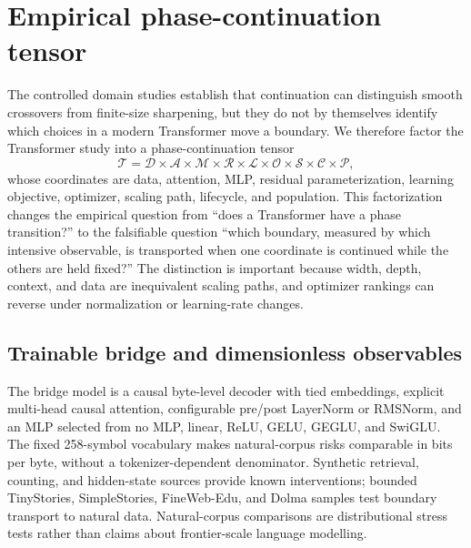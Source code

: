 \section{Empirical phase-continuation tensor}
\label{sec:empirical-tensor}

The controlled domain studies establish that continuation can distinguish smooth
crossovers from finite-size sharpening, but they do not by themselves identify
which choices in a modern Transformer move a boundary.  We therefore factor the
Transformer study into a phase-continuation tensor
\begin{equation}
  \mathcal{T}=
  \mathcal{D}\times\mathcal{A}\times\mathcal{M}\times\mathcal{R}
  \times\mathcal{L}\times\mathcal{O}\times\mathcal{S}
  \times\mathcal{C}\times\mathcal{P},
\end{equation}
whose coordinates are data, attention, MLP, residual parameterization,
learning objective, optimizer, scaling path, lifecycle, and population.  This
factorization changes the empirical question from ``does a Transformer have a
phase transition?'' to the falsifiable question ``which boundary, measured by
which intensive observable, is transported when one coordinate is continued
while the others are held fixed?''  The distinction is important because width,
depth, context, and data are inequivalent scaling paths, and optimizer rankings
can reverse under normalization or learning-rate changes.

\subsection{Trainable bridge and dimensionless observables}

The bridge model is a causal byte-level decoder with tied embeddings, explicit
multi-head causal attention, configurable pre/post LayerNorm or RMSNorm, and an
MLP selected from no MLP, linear, ReLU, GELU, GEGLU, and SwiGLU.  The fixed
258-symbol vocabulary makes natural-corpus risks comparable in bits per byte,
without a tokenizer-dependent denominator.  Synthetic retrieval, counting, and
hidden-state sources provide known interventions; bounded TinyStories,
SimpleStories, FineWeb-Edu, and Dolma samples test boundary transport to natural
data.  Natural-corpus comparisons are distributional stress tests rather than
claims about frontier-scale language modelling.

